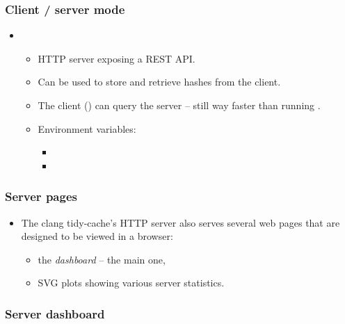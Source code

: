 \documentclass[compress,table,xcolor=table]{beamer}
\begin{document}
\begin{frame}
    \frametitle{Client / server mode}
    \LARGE
    \begin{itemize}
        \item {}
        \begin{itemize}
            \Large
            \item HTTP server exposing a REST API.
            \item Can be used to store and retrieve hashes from the client.
            \item The client () can query
                the server -- still way faster than running .
            \item Environment variables:
            \begin{itemize}
                \large
                \item {}
                \item {}
            \end{itemize}
        \end{itemize}
    \end{itemize}
\end{frame}
\begin{frame}
  \frametitle{Server pages}
  \LARGE
  \begin{itemize}
  \item The clang tidy-cache's HTTP server also serves several web pages
    that are designed to be viewed in a browser:
    \begin{itemize}
        \item the {\em dashboard} -- the main one,
        \item SVG plots showing various server statistics.
    \end{itemize}
  \end{itemize}
\end{frame}
\begin{frame}
  \frametitle{Server dashboard}
\end{frame}
\end{document}
